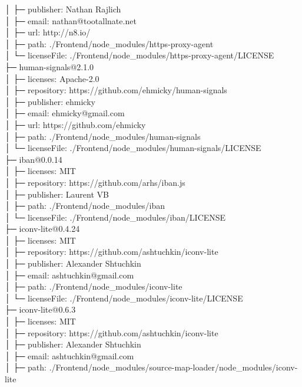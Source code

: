 │  ├─ publisher: Nathan Rajlich\\
│  ├─ email: nathan@tootallnate.net\\
│  ├─ url: http://n8.io/\\
│  ├─ path: ./Frontend/node\_modules/https-proxy-agent\\
│  └─ licenseFile: ./Frontend/node\_modules/https-proxy-agent/LICENSE\\
├─ human-signals@2.1.0\\
│  ├─ licenses: Apache-2.0\\
│  ├─ repository: https://github.com/ehmicky/human-signals\\
│  ├─ publisher: ehmicky\\
│  ├─ email: ehmicky@gmail.com\\
│  ├─ url: https://github.com/ehmicky\\
│  ├─ path: ./Frontend/node\_modules/human-signals\\
│  └─ licenseFile: ./Frontend/node\_modules/human-signals/LICENSE\\
├─ iban@0.0.14\\
│  ├─ licenses: MIT\\
│  ├─ repository: https://github.com/arhs/iban.js\\
│  ├─ publisher: Laurent VB\\
│  ├─ path: ./Frontend/node\_modules/iban\\
│  └─ licenseFile: ./Frontend/node\_modules/iban/LICENSE\\
├─ iconv-lite@0.4.24\\
│  ├─ licenses: MIT\\
│  ├─ repository: https://github.com/ashtuchkin/iconv-lite\\
│  ├─ publisher: Alexander Shtuchkin\\
│  ├─ email: ashtuchkin@gmail.com\\
│  ├─ path: ./Frontend/node\_modules/iconv-lite\\
│  └─ licenseFile: ./Frontend/node\_modules/iconv-lite/LICENSE\\
├─ iconv-lite@0.6.3\\
│  ├─ licenses: MIT\\
│  ├─ repository: https://github.com/ashtuchkin/iconv-lite\\
│  ├─ publisher: Alexander Shtuchkin\\
│  ├─ email: ashtuchkin@gmail.com\\
│  ├─ path: ./Frontend/node\_modules/source-map-loader/node\_modules/iconv-lite\\
